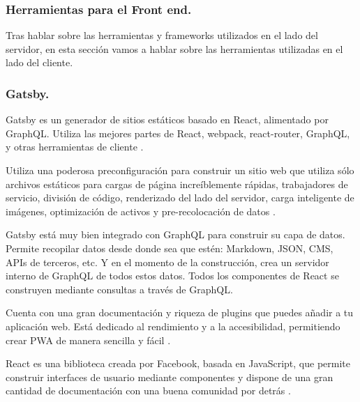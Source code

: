 \subsubsection{Herramientas para el Front end.}

Tras hablar sobre las herramientas y frameworks utilizados en el lado del servidor, en esta sección vamos a hablar 
sobre las herramientas utilizadas en el lado del cliente.

\subsubsection*{Gatsby.}

Gatsby es un generador de sitios estáticos basado en React, alimentado por GraphQL. Utiliza las mejores partes de 
React, webpack, react-router, GraphQL, y otras herramientas de cliente \cite{gatsby, what-is-gastby.js}.

\vspace{5mm}

\noindent Utiliza una poderosa preconfiguración para construir un sitio web que utiliza sólo archivos estáticos para 
cargas de página increíblemente rápidas, trabajadores de servicio, división de código, renderizado del lado del 
servidor, carga inteligente de imágenes, optimización de activos y pre-recolocación de datos 
\cite{what-is-gastby.js, why-gatsby}.

\vspace{5mm}

\noindent Gatsby está muy bien integrado con GraphQL para construir su capa de datos. Permite recopilar datos desde 
donde sea que estén: Markdown, JSON, CMS, APIs de terceros, etc. Y en el momento de la construcción, crea un servidor 
interno de GraphQL de todos estos datos. Todos los componentes de React se construyen mediante consultas a través de 
GraphQL.

\vspace{5mm}

\noindent Cuenta con una gran documentación y riqueza de plugins que puedes añadir a tu aplicación web. Está dedicado 
al rendimiento y a la accesibilidad, permitiendo crear PWA de manera sencilla y fácil \cite{why-gatsby}.

\vspace{5mm}

\noindent React es una biblioteca creada por Facebook, basada en JavaScript, que permite construir interfaces de 
usuario mediante componentes y dispone de una gran cantidad de documentación con una buena comunidad por detrás 
\cite{react}.

